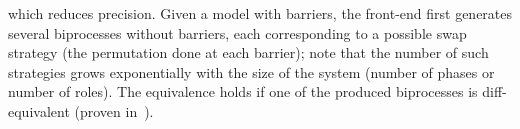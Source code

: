 which reduces precision.
%
%
%
Given a model with barriers, the front-end %
first generates several biprocesses without barriers,
each corresponding to a possible swap strategy (\ie the permutation
done at each barrier); note that the number of such strategies grows exponentially with the size of the system (number of phases or number of roles).
The equivalence holds if one of the produced biprocesses is diff-equivalent (proven in~\cite{vote-CSF16}).
%
